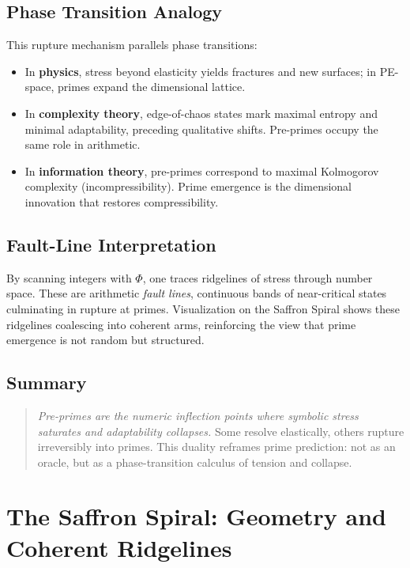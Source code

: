 \documentclass[11pt]{article}
\theoremstyle{plain}
\theoremstyle{definition}
\begin{document}
\subsection{Phase Transition Analogy}
This rupture mechanism parallels phase transitions:
\begin{itemize}
  \item In \textbf{physics}, stress beyond elasticity yields fractures and new surfaces; in PE-space, primes expand the dimensional lattice.
  \item In \textbf{complexity theory}, edge-of-chaos states mark maximal entropy and minimal adaptability, preceding qualitative shifts. Pre-primes occupy the same role in arithmetic.
  \item In \textbf{information theory}, pre-primes correspond to maximal Kolmogorov complexity (incompressibility). Prime emergence is the dimensional innovation that restores compressibility.
\end{itemize}

\subsection{Fault-Line Interpretation}
By scanning integers with $\Phi$, one traces ridgelines of stress through number space. These are arithmetic \emph{fault lines}, continuous bands of near-critical states culminating in rupture at primes.  
Visualization on the Saffron Spiral shows these ridgelines coalescing into coherent arms, reinforcing the view that prime emergence is not random but structured.

\subsection{Summary}
\begin{quote}
\emph{Pre-primes are the numeric inflection points where symbolic stress saturates and adaptability collapses.}  
Some resolve elastically, others rupture irreversibly into primes.  
This duality reframes prime prediction: not as an oracle, but as a phase-transition calculus of tension and collapse.
\end{quote}
 

\section{The Saffron Spiral: Geometry and Coherent Ridgelines}
\end{document}
